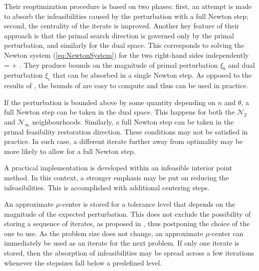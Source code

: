 {Their reoptimization procedure is based on two phases: first, an attempt 
is made to absorb the infeasibilities caused by the perturbation with a full 
Newton step; second, the centrality of the iterate is improved.
Another key feature of their approach is that the primal search 
direction is governed only by the primal perturbation, and similarly 
for the dual space. This corresponds to solving the Newton system 
(\ref{eq:NewtonSystem}) for the two right-hand sides independently
%
\be \label{eq:NewtonSystem2}
 = 
\left[ \begin{array}{c}
    \xi_b \\ 0 \\ 0
  \end{array} \right] +
\left[ \begin{array}{c}
    0 \\ \xi_c \\ 0
  \end{array} \right].
\ee
%
They produce bounds on the magnitude of primal perturbation $\xi_b$ 
and dual perturbation $\xi_c$ that can be absorbed in a single 
Newton step. As opposed to the results of \cite{YildirimWright}, 
the bounds of \cite{GondzioGrothey03} are easy to compute and 
thus can be used in practice.

If the perturbation is bounded above by some quantity depending 
on $n$ and $\theta$, a full Newton step can be taken in the dual space. 
This happens for both the $\mathcal{N}_2$ and $\mathcal{N}_\infty$ 
neighbourhoods. Similarly, a full Newton step can be taken in the 
primal feasibility restoration direction. These conditions may not 
be satisfied in practice. In such case, a different iterate further 
away from optimality may be more likely to allow for a full Newton step.

A practical implementation is developed within an infeasible interior 
point method. In this context, a stronger emphasis may be put on 
reducing the infeasibilities. This is accomplished with additional 
centering steps.

An approximate $\mu$-center is stored for a tolerance level that 
depends on the magnitude of the expected perturbation. This does not 
exclude the possibility of storing a sequence of iterates, as proposed 
in \cite{YildirimWright}, thus postponing the choice of the one to 
use.
As the problem size does not change, an approximate $\mu$-center 
can immediately be used as an iterate for the next problem.
If only one iterate is stored, then the absorption of infeasibilities 
may be spread across a few iterations whenever the stepsizes fall 
below a predefined level.

}
